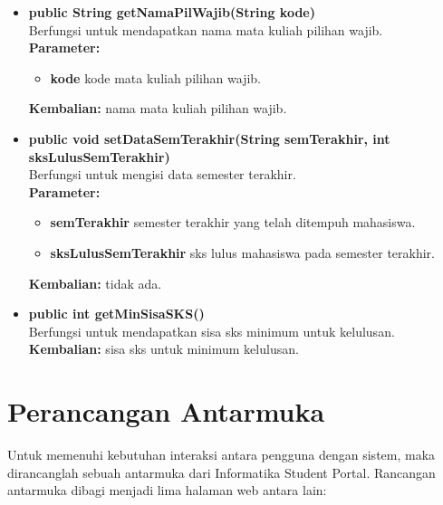 \begin{enumerate}
\begin{itemize}
			\item \textbf{public String getNamaPilWajib(String kode)}\\
				Berfungsi untuk mendapatkan nama mata kuliah pilihan wajib.\\
				\textbf{Parameter:}
					\begin{itemize}
						\item \textbf{kode} kode mata kuliah pilihan wajib.
					\end{itemize}
				\textbf{Kembalian:} nama mata kuliah pilihan wajib.

			\item \textbf{public void setDataSemTerakhir(String semTerakhir, int sksLulusSemTerakhir)}\\
				Berfungsi untuk mengisi data semester terakhir.\\
				\textbf{Parameter:}
				\begin{itemize}
					\item \textbf{semTerakhir} semester terakhir yang telah ditempuh mahasiswa.
					\item \textbf{sksLulusSemTerakhir} sks lulus mahasiswa pada semester terakhir.
				\end{itemize}
				\textbf{Kembalian:} tidak ada.
				
				\item \textbf{public int getMinSisaSKS()}\\
				Berfungsi untuk mendapatkan sisa sks minimum untuk kelulusan.\\
				\textbf{Kembalian:} sisa sks untuk minimum kelulusan.
		\end{itemize}
		
	\end{enumerate}

\section{Perancangan Antarmuka}
\label{sec:perancangan_antarmuka}

Untuk memenuhi kebutuhan interaksi antara pengguna dengan sistem, maka dirancanglah sebuah antarmuka dari Informatika Student Portal. Rancangan antarmuka dibagi menjadi lima halaman web antara lain:


